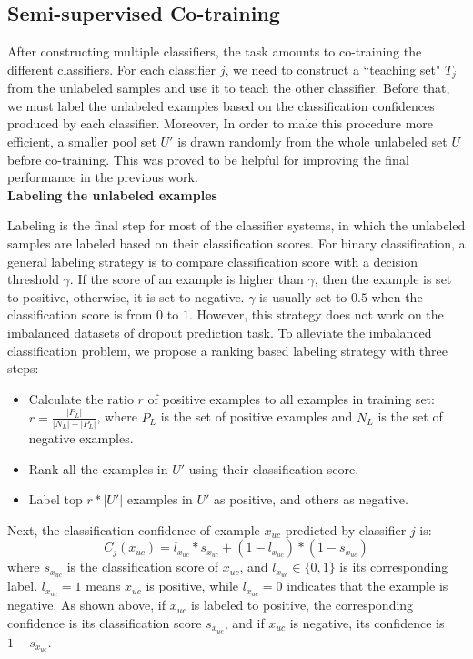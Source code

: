 	\subsection{Semi-supervised Co-training}
	\label{sec:co-training}
		After constructing multiple classifiers, the task amounts to co-training the different classifiers. For each classifier $j$, we need to construct a ``teaching set" $T_j$ from the unlabeled samples and use it to teach the other classifier. Before that, we must label the unlabeled examples based on the classification confidences produced by each classifier. Moreover, In order to make this procedure more efficient, a smaller pool set $U'$ is drawn randomly from the whole unlabeled set $U$ before co-training. This was proved to be helpful for improving the final performance in the previous work\cite{Blum:1998:CLU:279943.279962}.\\
	
	\noindent \textbf{Labeling the unlabeled examples}
    
	Labeling is the final step for most of the classifier systems, in which the unlabeled samples are labeled based on their classification scores. For binary classification, a general labeling strategy is to compare classification score with a decision threshold $\gamma$. If the score of an example is higher than $\gamma$, then the example is set to positive, otherwise, it is set to negative. $\gamma$ is usually set to $0.5$ when the classification score is from $0$ to $1$.  However, this strategy does not work on the imbalanced datasets of dropout prediction task. To alleviate the imbalanced classification problem, we propose a ranking based labeling strategy with three steps:
	\begin{itemize}
		\item Calculate the ratio $r$ of positive examples to all examples in training set: $r=\frac{|P_L|}{|N_L|+|P_L|}$, where $P_L$ is the set of positive examples and $N_L$ is the set of negative examples.
		\item Rank all the examples in $U'$ using their classification score.
		\item Label top $r * |U'|$ examples in $U'$ as positive, and others as negative.
	\end{itemize}
    Next, the classification confidence of example $x_{uc}$ predicted by classifier $j$ is:
    \begin{equation}
    C_j(x_{uc})=l_{x_{uc}}*s_{x_{uc}} + (1-l_{x_{uc}})*(1-s_{x_{uc}})
    \end{equation}
    where $s_{x_{uc}}$ is the classification score of $x_{uc}$, and $l_{x_{uc}} \in \{0,1\}$ is its corresponding label. $l_{x_{uc}} = 1$ means $x_{uc}$ is positive, while $l_{x_{uc}} = 0$ indicates that the example is negative. As shown above, if $x_{uc}$ is labeled to positive, the corresponding confidence is  its classification score $s_{x_{uc}}$, and if $x_{uc}$ is negative, its confidence is $1- s_{x_{uc}}$.\\
    
